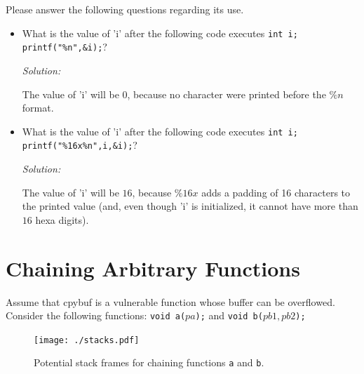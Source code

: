 \documentclass[a4paper,11pt]{article}
\newenvironment{solution}%
{\par{\noindent\small\textit{Solution:}}\vspace{-12pt}\begin{framed}}%
{\end{framed}\par}
\begin{document}
\noindent Please answer the following questions regarding its use.

\begin{itemize}
\item What is the value of 'i' after the following code executes
\texttt{int i; printf("\%n",\&i);}?
\ifsolution\begin{solution}
The value of 'i' will be $0$, because no character were printed before the $\%n$ format.
\end{solution}\fi
\item What is the value of 'i' after the following code executes \texttt{int i;
    printf("\%16x\%n",i,\&i);}?
\ifsolution\begin{solution}
The value of 'i' will be $16$, because $\%16x$ adds a padding of 16 characters to the printed value
(and, even though 'i' is initialized, it cannot have more than $16$ hexa digits).
\end{solution}\fi
\end{itemize}

\section*{Chaining Arbitrary Functions}
Assume that cpybuf is a vulnerable function whose buffer can be
overflowed. Consider the following functions: \texttt{void a(\(pa\));} and
\texttt{void b(\(pb1, pb2\));} 

\begin{figure}[t]
    \centering
    \texttt{[image: ./stacks.pdf]}
    \caption{Potential stack frames for chaining functions \texttt{a} and \texttt{b}.}
    \label{fig:stacks}
\end{figure}
\end{document}

